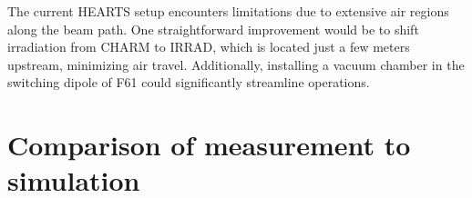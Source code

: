 \documentclass[a4paper,
               biblatex,     %
               ]{jacow}
\begin{document}
The current HEARTS setup encounters limitations due to extensive air regions along the beam path. One straightforward improvement would be to shift irradiation from CHARM to IRRAD, which is located just a few meters upstream, minimizing air travel. Additionally, installing a vacuum chamber in the switching dipole of F61 could significantly streamline operations.









\section{Comparison of measurement to simulation}



\end{document}
